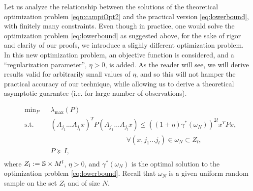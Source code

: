 Let us analyze the relationship between the solutions of the theoretical optimization problem \eqref{eqn:campiOpt2} and the practical version \eqref{eq:lowerbound}, with finitely many constraints. Even though in practice, one would solve the optimization problem  \eqref{eq:lowerbound} as suggested above, for the sake of rigor and clarity of our proofs, we introduce a slighly different optimization problem. In this new optimization problem, an objective function is considered, and a ``regularization parameter'', $\eta > 0$, is added. As the reader will see, we will derive results valid for arbitrarily small values of $\eta$, and so this will not hamper the practical accuracy of our technique, while allowing us to derive a theoretical asymptotic guarantee (i.e. for large number of observations).

\begin{equation}\label{eqn:campiOpt03}
\begin{aligned}
& \text{min}_{P} & & \lambda_{\max}(P) \\
& \text{s.t.} 
&  & (A_{j_{1}}\dots A_{j_{l}}x)^TP(A_{j_{1}}\dots A_{j_{l}}x) \leq {((1 +\eta)\gamma^*(\omega_N))}^{2l} x^TPx,\\
&&&\qquad \qquad \qquad \qquad \quad \qquad \forall (x, j_{1}\dots j_{l}) \in \omega_N \subset Z_l, \\
& && P \succeq I, \\
\end{aligned}
\end{equation}
where $Z_l:= \mathbb{S} \times M^l$, $\eta > 0$, and $\gamma^*(\omega_N)$ is the optimal solution to the optimization problem \eqref{eq:lowerbound}. Recall that $\omega_N$ is a given uniform random sample on the set $Z_l$ and of size $N$. 

